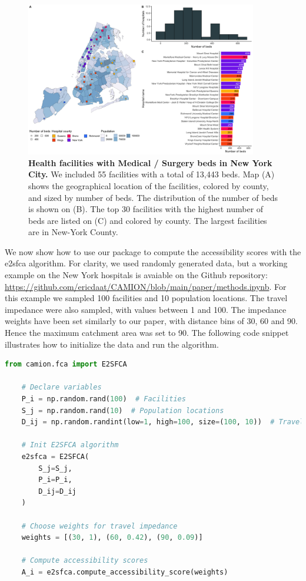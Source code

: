 \begin{figure}[h!]
    \includegraphics[width=0.9\textwidth]{images/camion-ny/fig1.png}
    \centering
    \caption{ \textbf{Health facilities with Medical / Surgery beds in New York
            City.} We included 55 facilities with a total of 13,443 beds. Map (A)
        shows the geographical location of the facilities, colored by county,
        and sized by number of beds. The distribution of the number of beds is
        shown on (B). The top 30 facilities with the highest number of beds are
        listed on (C) and colored by county. The largest facilities are in
        New-York County. }
    \label{fig:camion-ny-beds}
\end{figure}

We now show how to use our package to compute the accessibility scores with
the \ac{e2sfca} algorithm. For clarity, we used randomly generated data,
but a working example on the New York hospitals is avaiable on the Github
repository: \url{https://github.com/ericdaat/CAMION/blob/main/paper/methods.ipynb}.
For this example we sampled 100 facilities and 10 population locations. The
travel impedance were also sampled, with values between 1 and 100. The impedance
weights have been set similarly to our paper, with distance bins of 30, 60 and
90. Hence the maximum catchment area was set to 90. The following code snippet
illustrates how to initialize the data and run the algorithm.

\begin{minipage}{\textwidth}
    \begin{lstlisting}[language=Python, caption=Compute accessibility score with \ac{e2sfca}]
    from camion.fca import E2SFCA

    # Declare variables
    P_i = np.random.rand(100)  # Facilities
    S_j = np.random.rand(10)  # Population locations
    D_ij = np.random.randint(low=1, high=100, size=(100, 10))  # Travel impedance

    # Init E2SFCA algorithm
    e2sfca = E2SFCA(
        S_j=S_j,
        P_i=P_i,
        D_ij=D_ij
    )

    # Choose weights for travel impedance
    weights = [(30, 1), (60, 0.42), (90, 0.09)]

    # Compute accessibility scores
    A_i = e2sfca.compute_accessibility_score(weights)
    \end{lstlisting}
\end{minipage}

